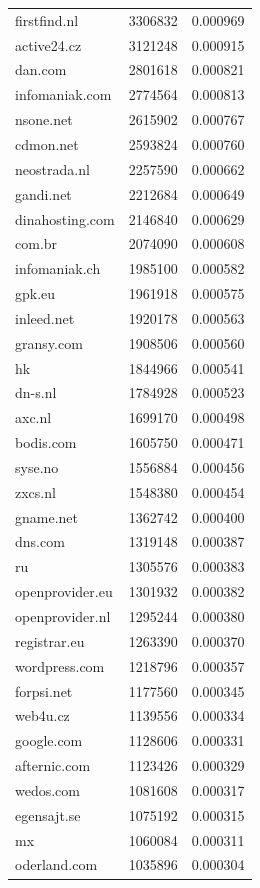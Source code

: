 \begin{tabular}{lrr}
firstfind.nl & 3306832 & 0.000969 \\
active24.cz & 3121248 & 0.000915 \\
dan.com & 2801618 & 0.000821 \\
infomaniak.com & 2774564 & 0.000813 \\
nsone.net & 2615902 & 0.000767 \\
cdmon.net & 2593824 & 0.000760 \\
neostrada.nl & 2257590 & 0.000662 \\
gandi.net & 2212684 & 0.000649 \\
dinahosting.com & 2146840 & 0.000629 \\
com.br & 2074090 & 0.000608 \\
infomaniak.ch & 1985100 & 0.000582 \\
gpk.eu & 1961918 & 0.000575 \\
inleed.net & 1920178 & 0.000563 \\
gransy.com & 1908506 & 0.000560 \\
hk & 1844966 & 0.000541 \\
dn-s.nl & 1784928 & 0.000523 \\
axc.nl & 1699170 & 0.000498 \\
bodis.com & 1605750 & 0.000471 \\
syse.no & 1556884 & 0.000456 \\
zxcs.nl & 1548380 & 0.000454 \\
gname.net & 1362742 & 0.000400 \\
dns.com & 1319148 & 0.000387 \\
ru & 1305576 & 0.000383 \\
openprovider.eu & 1301932 & 0.000382 \\
openprovider.nl & 1295244 & 0.000380 \\
registrar.eu & 1263390 & 0.000370 \\
wordpress.com & 1218796 & 0.000357 \\
forpsi.net & 1177560 & 0.000345 \\
web4u.cz & 1139556 & 0.000334 \\
google.com & 1128606 & 0.000331 \\
afternic.com & 1123426 & 0.000329 \\
wedos.com & 1081608 & 0.000317 \\
egensajt.se & 1075192 & 0.000315 \\
mx & 1060084 & 0.000311 \\
oderland.com & 1035896 & 0.000304 \\

\end{tabular}
